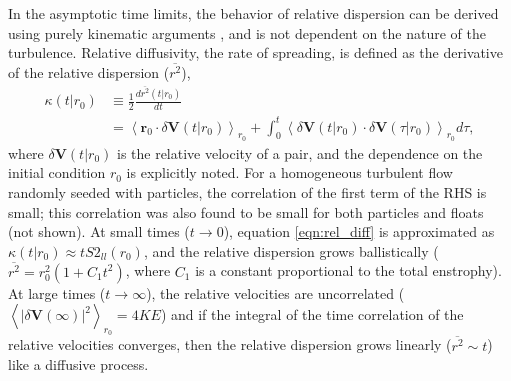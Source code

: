 \documentclass[]{ametsoc}
\begin{document}
In the asymptotic time limits, the behavior of relative dispersion can be derived using purely kinematic arguments \citep{babiano1990relative}, and is not dependent on the nature of the turbulence. Relative diffusivity, the rate of spreading, is defined as the derivative of the relative dispersion ($\overline{r^2}$), 
\begin{equation}
\begin{split}
\kappa(t | r_0) & \equiv \frac{1}{2} \frac{d \overline{r^2} (t | r_0)}{dt} \\		       & = \left< \mathbf{r}_0 \cdot \delta \mathbf{V}(t | r_0) \right>_{r_0}  + \int_0^t \left<\delta \mathbf{V}(t | r_0) \cdot \delta \mathbf{V}(\tau | r_0)\right>_{r_0} d\tau,
\end{split}
\label{eqn:rel_diff}
\end{equation}
where $\delta \mathbf{V} (t | r_0)$ is the relative velocity of a pair, and the dependence on the initial condition $r_0$ is explicitly noted. For a homogeneous turbulent flow randomly seeded with particles, the correlation of the first term of the RHS is small; this correlation was also found to be small for both particles and floats (not shown). At small times ($t\rightarrow0$), equation \ref{eqn:rel_diff} is approximated as $\kappa(t|r_0) \approx t S2_{ll}(r_0)$, and the relative dispersion grows ballistically ($\overline{r^2} = r_0^2(1 + C_1t^2)$, where $C_1$ is a constant proportional to the total enstrophy). At large times ($t\rightarrow\infty$), the relative velocities are uncorrelated ($\left<|\delta \mathbf{V}(\infty )|^2\right>_{r_0} = 4 KE$) and if the integral of the time correlation of the relative velocities converges, then the relative dispersion grows linearly  ($\overline{r^2} \sim t$) like a diffusive process. 
\end{document}
